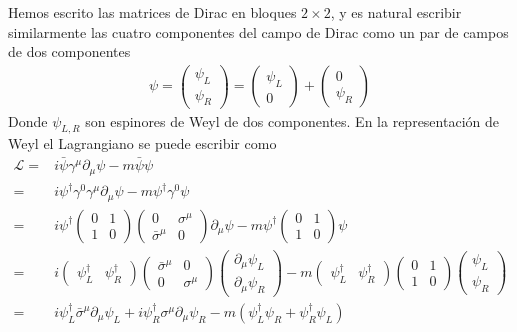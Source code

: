 Hemos escrito las matrices de Dirac en bloques $2\times2$, y es natural escribir similarmente las cuatro componentes del campo de Dirac como un par de campos de dos componentes
\begin{align}
  \psi=  \begin{pmatrix}
    \psi_L\\
    \psi_R    
  \end{pmatrix}=\begin{pmatrix}
    \psi_L\\
    0   
  \end{pmatrix}+\begin{pmatrix}
    0\\
    \psi_R    
  \end{pmatrix}
\end{align}
Donde $\psi_{L,R}$ son espinores de Weyl de dos componentes. En la representaci\'on de Weyl el Lagrangiano se puede escribir como
\begin{align}
\label{eq:200}
  \mathcal{L}=&i\bar{\psi}\gamma^\mu\partial_\mu\psi-m\bar{\psi}\psi\nonumber\\
  =&i\psi^\dagger \gamma^0\gamma^\mu\partial_\mu\psi-m\psi^\dagger \gamma^0 \psi\nonumber\\
  =&i\psi^\dagger  \begin{pmatrix}
    0 & 1\\
    1&0
  \end{pmatrix}
  \begin{pmatrix}
    0 &\sigma^\mu \\
    \bar{\sigma}^\mu&0
  \end{pmatrix}\partial_\mu\psi-m\psi^\dagger
  \begin{pmatrix}
    0 & 1\\
    1&0
  \end{pmatrix}\psi\nonumber\\
=&i\begin{pmatrix}
 \psi_L^\dagger & \psi_R^\dagger
\end{pmatrix}
 \begin{pmatrix}
   \bar{\sigma}^\mu &0\\
   0&\sigma^\mu
 \end{pmatrix} \begin{pmatrix}
   \partial_\mu\psi_L\\
   \partial_\mu\psi_R
 \end{pmatrix}-m
 \begin{pmatrix}
   \psi_L^\dagger&\psi_R^\dagger
 \end{pmatrix}
 \begin{pmatrix}
   0&1\\
   1&0
 \end{pmatrix}
 \begin{pmatrix}
   \psi_L\\ \psi_R
 \end{pmatrix}\nonumber\\
 =& i\psi_L^\dagger \bar{\sigma}^\mu\partial_\mu\psi_L+i\psi_R^\dagger \sigma^\mu\partial_\mu\psi_R
  -m(\psi_L^\dagger \psi_R+\psi_R^\dagger \psi_L)
\end{align}

